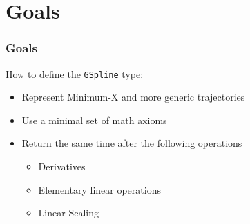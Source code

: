 \section{Goals}

\begin{frame}[t]
	\frametitle{Goals}

	\vfill
	{\fontsize{10}{6}
		How to define the \texttt{GSpline} type:
		\begin{itemize}
			\item Represent Minimum-X and more generic trajectories
			\item Use a minimal set of math axioms
			\item Return the same time after the following operations
			      \begin{itemize}
				      \item Derivatives
				      \item Elementary linear operations
				      \item Linear Scaling
			      \end{itemize}
		\end{itemize}
	}
	\vfill
\end{frame}

